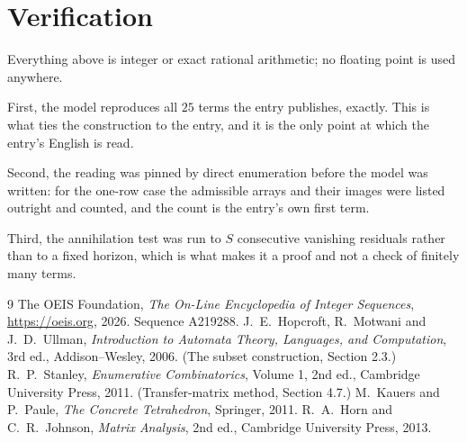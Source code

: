 \documentclass[11pt,a4paper]{article}
\theoremstyle{plain}
\theoremstyle{definition}
\begin{document}
\section{Verification}

Everything above is integer or exact rational arithmetic; no floating point is used anywhere.

First, the model reproduces all $25$ terms the entry publishes, exactly. This is what
ties the construction to the entry, and it is the only point at which the entry's English is
read.

Second, the reading was pinned by direct enumeration before the model was written: for the
one-row case the admissible arrays and their images were listed outright and counted, and the
count is the entry's own first term.

Third, the annihilation test was run to $S$ consecutive vanishing residuals rather than to a
fixed horizon, which is what makes it a proof and not a check of finitely many terms.

\begin{thebibliography}{9}
 The OEIS Foundation, \emph{The On-Line Encyclopedia of Integer
Sequences}, \url{https://oeis.org}, 2026. Sequence A219288.
 J.~E.~Hopcroft, R.~Motwani and J.~D.~Ullman, \emph{Introduction to Automata
Theory, Languages, and Computation}, 3rd ed., Addison--Wesley, 2006. (The subset
construction, Section 2.3.)
 R.~P.~Stanley, \emph{Enumerative Combinatorics}, Volume 1, 2nd ed.,
Cambridge University Press, 2011. (Transfer-matrix method, Section 4.7.)
 M.~Kauers and P.~Paule, \emph{The Concrete Tetrahedron}, Springer, 2011.
 R.~A.~Horn and C.~R.~Johnson, \emph{Matrix Analysis}, 2nd ed., Cambridge
University Press, 2013.
\end{thebibliography}
\end{document}
